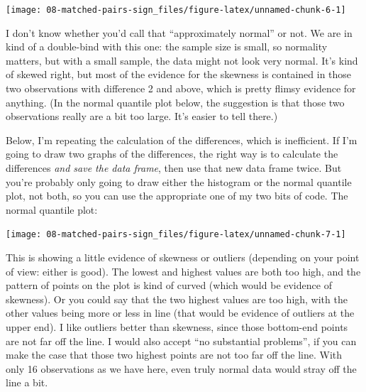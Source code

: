 \documentclass[]{tufte-book}
\newenvironment{Shaded}{}{}
\newcommand{\DataTypeTok}[1]{\textcolor[rgb]{0.56,0.13,0.00}{#1}}
\newcommand{\KeywordTok}[1]{\textcolor[rgb]{0.00,0.44,0.13}{\textbf{#1}}}
\newcommand{\NormalTok}[1]{#1}
\newcommand{\OperatorTok}[1]{\textcolor[rgb]{0.40,0.40,0.40}{#1}}
\newcommand{\StringTok}[1]{\textcolor[rgb]{0.25,0.44,0.63}{#1}}
\theoremstyle{definition}
\theoremstyle{definition}
\theoremstyle{definition}
\theoremstyle{remark}
\begin{document}
\texttt{[image: 08-matched-pairs-sign\_files/figure-latex/unnamed-chunk-6-1]}

I don't know whether you'd call that ``approximately normal'' or not. We
are in kind of a double-bind with this one: the sample size is small, so
normality matters, but with a small sample, the data might not look very
normal. It's kind of skewed right, but most of the evidence for the
skewness is contained in those two observations with difference 2 and
above, which is pretty flimsy evidence for anything. (In the normal
quantile plot below, the suggestion is that those two observations
really are a bit too large. It's easier to tell there.)

Below, I'm repeating the calculation of the differences, which is
inefficient. If I'm going to draw two graphs of the differences, the
right way is to calculate the differences \emph{and save the data
frame}, then use that new data frame twice. But you're probably only
going to draw either the histogram or the normal quantile plot, not
both, so you can use the appropriate one of my two bits of code. The
normal quantile plot:

\begin{Shaded}
\end{Shaded}

\texttt{[image: 08-matched-pairs-sign\_files/figure-latex/unnamed-chunk-7-1]}

This is showing a little evidence of skewness or outliers (depending on
your point of view: either is good). The lowest and highest values are
both too high, and the pattern of points on the plot is kind of curved
(which would be evidence of skewness). Or you could say that the two
highest values are too high, with the other values being more or less in
line (that would be evidence of outliers at the upper end). I like
outliers better than skewness, since those bottom-end points are not far
off the line. I would also accept ``no substantial problems'', if you
can make the case that those two highest points are not too far off the
line. With only 16 observations as we have here, even truly normal data
would stray off the line a bit.
\end{document}
